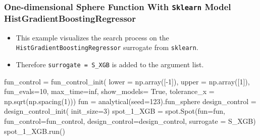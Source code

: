 \documentclass[
  letterpaper,
  DIV=11,
  numbers=noendperiod]{scrreprt}
\newenvironment{Shaded}{\begin{snugshade}}{\end{snugshade}}
\newcommand{\DecValTok}[1]{\textcolor[rgb]{0.68,0.00,0.00}{#1}}
\newcommand{\NormalTok}[1]{\textcolor[rgb]{0.00,0.23,0.31}{#1}}
\newcommand{\OperatorTok}[1]{\textcolor[rgb]{0.37,0.37,0.37}{#1}}
\newcommand{\VariableTok}[1]{\textcolor[rgb]{0.07,0.07,0.07}{#1}}
\providecommand{\tightlist}{%
  \setlength{\itemsep}{0pt}\setlength{\parskip}{0pt}}\usepackage{longtable,booktabs,array}
\begin{document}
\subsubsection{\texorpdfstring{One-dimensional Sphere Function With
\texttt{Sklearn} Model
HistGradientBoostingRegressor}{One-dimensional Sphere Function With Sklearn Model HistGradientBoostingRegressor}}\label{one-dimensional-sphere-function-with-sklearn-model-histgradientboostingregressor}

\begin{itemize}
\tightlist
\item
  This example visualizes the search process on the
  \texttt{HistGradientBoostingRegressor} surrogate from
  \texttt{sklearn}.
\item
  Therefore \texttt{surrogate\ =\ S\_XGB} is added to the argument list.
\end{itemize}

\begin{Shaded}
\begin{Highlighting}[]
\NormalTok{fun\_control }\OperatorTok{=}\NormalTok{ fun\_control\_init(}
\NormalTok{    lower }\OperatorTok{=}\NormalTok{ np.array([}\OperatorTok{{-}}\DecValTok{1}\NormalTok{]),}
\NormalTok{    upper }\OperatorTok{=}\NormalTok{ np.array([}\DecValTok{1}\NormalTok{]),}
\NormalTok{    fun\_evals}\OperatorTok{=}\DecValTok{10}\NormalTok{,}
\NormalTok{    max\_time}\OperatorTok{=}\NormalTok{inf,}
\NormalTok{    show\_models}\OperatorTok{=} \VariableTok{True}\NormalTok{,}
\NormalTok{    tolerance\_x }\OperatorTok{=}\NormalTok{ np.sqrt(np.spacing(}\DecValTok{1}\NormalTok{)))}
\NormalTok{fun }\OperatorTok{=}\NormalTok{ analytical(seed}\OperatorTok{=}\DecValTok{123}\NormalTok{).fun\_sphere}
\NormalTok{design\_control }\OperatorTok{=}\NormalTok{ design\_control\_init(}
\NormalTok{    init\_size}\OperatorTok{=}\DecValTok{3}\NormalTok{)}
\NormalTok{spot\_1\_XGB }\OperatorTok{=}\NormalTok{ spot.Spot(fun}\OperatorTok{=}\NormalTok{fun,}
\NormalTok{                      fun\_control}\OperatorTok{=}\NormalTok{fun\_control,}
\NormalTok{                      design\_control}\OperatorTok{=}\NormalTok{design\_control,}
\NormalTok{                      surrogate }\OperatorTok{=}\NormalTok{ S\_XGB)}
\NormalTok{spot\_1\_XGB.run()}
\end{Highlighting}
\end{Shaded}
\end{document}
